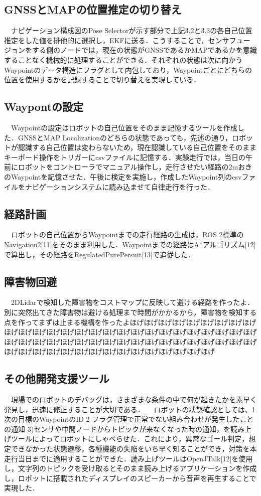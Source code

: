 \documentclass[platex,dvipdfmx]{rbproceedings}
\begin{document}
\subsection{GNSSとMAPの位置推定の切り替え}
　ナビゲーション構成図のPose Selectorが示す部分で上記3.2と3.3の各自己位置推定をした値を排他的に選択し，EKFに送る．こうすることで，センサフュージョンをする側のノードでは，現在の状態がGNSSであるかMAPであるかを意識することなく機械的に処理することができる．それぞれの状態は次に向かうWaypointのデータ構造にフラグとして内包しており，Waypointごとにどちらの位置を使用するかを記録することで切り替えを実現している．

\subsection{Waypontの設定}
　Waypointの設定はロボットの自己位置をそのまま記憶するツールを作成した．GNSSとMAP Localizationのどちらの状態であっても，先述の通り，ロボットが認識する自己位置は変わらないため，現在認識している自己位置をそのままキーボード操作をトリガーにcsvファイルに記憶する．実験走行では，当日の午前にロボットをコントローラでマニュアル操作し，走行させたい経路の2mおきのWaypointを記憶させた．午後に検定を実施し，作成したWaypoint列のcsvファイルをナビゲーションシステムに読み込ませて自律走行を行った．

\subsection{経路計画}
　ロボットの自己位置からWaypointまでの走行経路の生成は，ROS 2標準のNavigation2[11]をそのまま利用した．Waypointまでの経路はA*アルゴリズム[12]で算出し，その経路をRegulatedPurePersuit[13]で追従した．

\subsection{障害物回避}
　2DLidarで検知した障害物をコストマップに反映して避ける経路を作ったよ．別に突然出てきた障害物は避ける処理まで時間がかかるから，障害物を検知する点を作ってまずは止まる機構を作ったよほげほげほげほげほげほげほげほげほげほげほげほげほげほげほげほげほげほげほげほげほげほげほげほげほげほげほげほげほげほげほげほげほげほげほげほげほげほげほげほげほげほげほげほげほげほげほげほげほげほげほげほげほげほげほげほげほげほげほげほげ

\subsection{その他開発支援ツール}
　現場でのロボットのデバッグは，さまざまな条件の中で何が起きたかを素早く発見し，迅速に修正することが大切である．
　ロボットの状態確認としては、1  次の目標のWaypointのID 2  フラグ管理で正常でない組み合わせが発生したことの通知 3)センサや中間ノードからトピックが来なくなった時の通知，を読み上げツールによってロボットにしゃべらせた．これにより，異常なゴール判定，想定できなかった状態遷移，各種機能の失陥をいち早く知ることができ，対策を本走行当日までに適用することができた．読み上げツールはOpenJTalk[12]を使用し，文字列のトピックを受け取るとそのまま読み上げるアプリケーションを作成し，ロボットに搭載されたディスプレイのスピーカーから音声を再生することで実現した．
\end{document}
